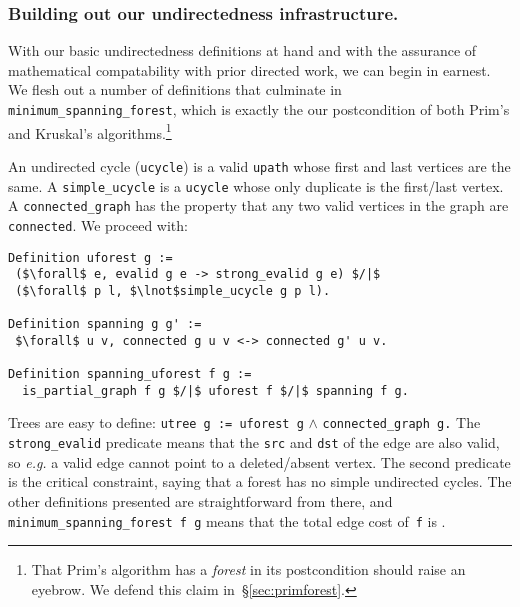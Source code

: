 \subsubsection{Building out our undirectedness infrastructure.}
With our basic undirectedness definitions at hand and with the assurance
of mathematical compatability with prior directed work, we can begin in 
earnest. We flesh out a number of definitions that culminate in 
\texttt{minimum\_spanning\_forest}, which is exactly the our postcondition
of both Prim's and Kruskal's algorithms.\footnote{That Prim's algorithm has
a \emph{forest} in its postcondition should raise an eyebrow. We defend this claim
in~\S\ref{sec:primforest}.}

An undirected cycle (\texttt{ucycle}) is a valid \texttt{upath} whose first 
and last vertices are the same.  A \texttt{simple\_ucycle} is a \texttt{ucycle} whose
only duplicate is the first/last vertex. A \texttt{connected\_graph}
has the property that any two valid vertices in the graph are \texttt{connected}.
We proceed with:
\lstset{style=CoqStyle}
\begin{lstlisting}
Definition uforest g := 
 ($\forall$ e, evalid g e -> strong_evalid g e) $/|$
 ($\forall$ p l, $\lnot$simple_ucycle g p l).

Definition spanning g g' := 
 $\forall$ u v, connected g u v <-> connected g' u v.

Definition spanning_uforest f g :=
  is_partial_graph f g $/|$ uforest f $/|$ spanning f g. 
\end{lstlisting}
Trees are easy to define:
\texttt{utree~g~:= uforest~g} $\wedge$ \texttt{connected\_graph~g.}
The \texttt{strong\_evalid} predicate means that the 
\texttt{src} and \texttt{dst} of the edge are also valid, so
\emph{e.g.} a valid edge cannot point to a deleted/absent vertex.
The second predicate is the critical constraint, saying that a
forest has no simple undirected cycles. The other definitions presented
are straightforward from there, and 
\texttt{minimum\_spanning\_forest f g} means that the total edge cost 
of~\texttt{f} is .


